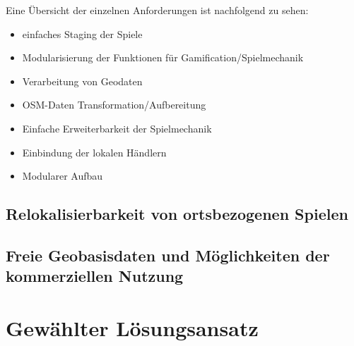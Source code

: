 Eine Übersicht der einzelnen Anforderungen ist nachfolgend zu sehen:

\begin{itemize}
\item einfaches Staging der Spiele
\item Modularisierung der Funktionen für Gamification/Spielmechanik
\item Verarbeitung von Geodaten
\item OSM-Daten Transformation/Aufbereitung
\item Einfache Erweiterbarkeit der Spielmechanik
\item Einbindung der lokalen Händlern
\item Modularer Aufbau
\end{itemize}


\subsection*{Relokalisierbarkeit von ortsbezogenen Spielen}

\subsection*{Freie Geobasisdaten und Möglichkeiten der kommerziellen Nutzung}

\section{Gewählter Lösungsansatz}


